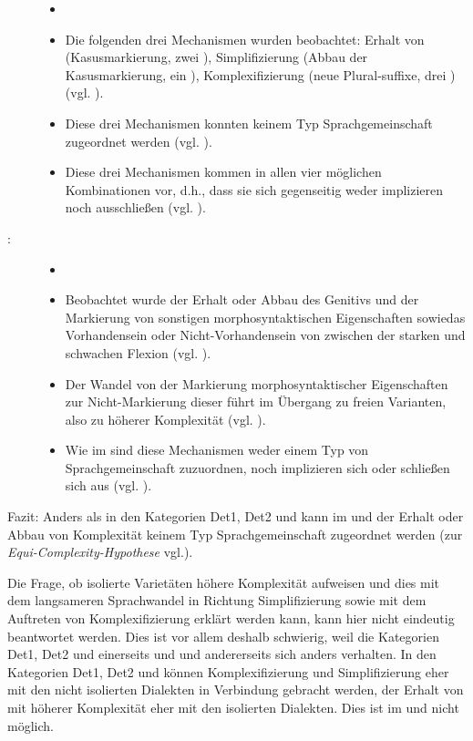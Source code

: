 \begin{description}
 \item[]
\begin{itemize}
\item[]
\item
Die folgenden drei Mechanismen wurden beobachtet: Erhalt von  (Kasusmarkierung, zwei ), Simplifizierung (Abbau der Kasusmarkierung, ein ), Komplexifizierung (neue Plural-\linebreak suffixe, drei ) (vgl. ).
\item
Diese drei Mechanismen konnten keinem Typ Sprachgemeinschaft zugeordnet werden (vgl. ).
\item
Diese drei Mechanismen kommen in allen vier möglichen Kombinationen vor, d.h., dass sie sich gegenseitig weder implizieren noch ausschließen (vgl. ).
\end{itemize}

\item[:]

\begin{itemize}
\item[]
\item
Beobachtet wurde der Erhalt oder Abbau des Genitivs und der Markierung von sonstigen morphosyntaktischen Eigenschaften sowie\linebreak das Vorhandensein oder Nicht-Vorhandensein von  zwischen der starken und schwachen Flexion (vgl. ).
\item
Der Wandel von der Markierung morphosyntaktischer Eigenschaften zur Nicht-Mar\-kie\-rung dieser führt im Übergang zu freien Varianten, also zu höherer Komplexität (vgl. ).
\item
Wie im  sind diese Mechanismen weder einem Typ von Sprachgemeinschaft zuzuordnen, noch implizieren sich oder schließen sich aus (vgl. ).
\end{itemize}
\end{description}

Fazit: Anders als in den Kategorien Det1, Det2 und  kann im  und  der Erhalt oder Abbau von Komplexität keinem Typ Sprachgemeinschaft zugeordnet werden (zur \textit{Equi-Com\-ple\-xi\-ty-Hy\-po\-the\-se} vgl.\linebreak {}).

Die Frage, ob isolierte Varietäten höhere Komplexität aufweisen und dies mit dem langsameren Sprachwandel in Richtung Simplifizierung sowie mit dem Auftreten von Komplexifizierung erklärt werden kann, kann hier nicht eindeutig beantwortet werden. Dies ist vor allem deshalb schwierig, weil die Kategorien Det1, Det2 und  einerseits und  und  andererseits sich anders verhalten. In den Kategorien Det1, Det2 und  können Komplexifizierung und Simplifizierung eher mit den nicht isolierten Dialekten in Verbindung gebracht werden, der Erhalt von  mit höherer Komplexität eher mit den isolierten Dialekten. Dies ist im  und  nicht möglich.
